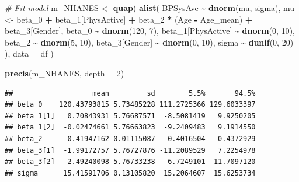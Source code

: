 \documentclass[
]{book}
\newenvironment{Shaded}{\begin{snugshade}}{\end{snugshade}}
\newcommand{\AttributeTok}[1]{\textcolor[rgb]{0.13,0.29,0.53}{#1}}
\newcommand{\CommentTok}[1]{\textcolor[rgb]{0.56,0.35,0.01}{\textit{#1}}}
\newcommand{\DecValTok}[1]{\textcolor[rgb]{0.00,0.00,0.81}{#1}}
\newcommand{\FunctionTok}[1]{\textcolor[rgb]{0.13,0.29,0.53}{\textbf{#1}}}
\newcommand{\NormalTok}[1]{#1}
\newcommand{\OtherTok}[1]{\textcolor[rgb]{0.56,0.35,0.01}{#1}}
\newcommand{\SpecialCharTok}[1]{\textcolor[rgb]{0.81,0.36,0.00}{\textbf{#1}}}
\begin{document}
\begin{Shaded}
\begin{Highlighting}[]
\CommentTok{\# Fit model}
\NormalTok{m\_NHANES }\OtherTok{\textless{}{-}} \FunctionTok{quap}\NormalTok{(}
  \FunctionTok{alist}\NormalTok{(}
\NormalTok{    BPSysAve }\SpecialCharTok{\textasciitilde{}} \FunctionTok{dnorm}\NormalTok{(mu, sigma), }
\NormalTok{    mu }\OtherTok{\textless{}{-}}\NormalTok{ beta\_0 }\SpecialCharTok{+}\NormalTok{ beta\_1[PhysActive] }\SpecialCharTok{+}\NormalTok{ beta\_2 }\SpecialCharTok{*}\NormalTok{ (Age }\SpecialCharTok{{-}}\NormalTok{ Age\_mean) }\SpecialCharTok{+}\NormalTok{ beta\_3[Gender],}
\NormalTok{    beta\_0 }\SpecialCharTok{\textasciitilde{}} \FunctionTok{dnorm}\NormalTok{(}\DecValTok{120}\NormalTok{, }\DecValTok{7}\NormalTok{),}
\NormalTok{    beta\_1[PhysActive] }\SpecialCharTok{\textasciitilde{}} \FunctionTok{dnorm}\NormalTok{(}\DecValTok{0}\NormalTok{, }\DecValTok{10}\NormalTok{),  }
\NormalTok{    beta\_2 }\SpecialCharTok{\textasciitilde{}} \FunctionTok{dnorm}\NormalTok{(}\DecValTok{5}\NormalTok{, }\DecValTok{10}\NormalTok{),}
\NormalTok{    beta\_3[Gender] }\SpecialCharTok{\textasciitilde{}} \FunctionTok{dnorm}\NormalTok{(}\DecValTok{0}\NormalTok{, }\DecValTok{10}\NormalTok{),  }
\NormalTok{    sigma }\SpecialCharTok{\textasciitilde{}} \FunctionTok{dunif}\NormalTok{(}\DecValTok{0}\NormalTok{, }\DecValTok{20}\NormalTok{) }
\NormalTok{  ),}
  \AttributeTok{data =}\NormalTok{ df}
\NormalTok{)}

\FunctionTok{precis}\NormalTok{(m\_NHANES, }\AttributeTok{depth =} \DecValTok{2}\NormalTok{)}
\end{Highlighting}
\end{Shaded}

\begin{verbatim}
##                   mean         sd        5.5%       94.5%
## beta_0    120.43793815 5.73485228 111.2725366 129.6033397
## beta_1[1]   0.70843931 5.76687571  -8.5081419   9.9250205
## beta_1[2]  -0.02474661 5.76663823  -9.2409483   9.1914550
## beta_2      0.41947162 0.01115087   0.4016504   0.4372929
## beta_3[1]  -1.99172757 5.76727876 -11.2089529   7.2254978
## beta_3[2]   2.49240098 5.76733238  -6.7249101  11.7097120
## sigma      15.41591706 0.13105820  15.2064607  15.6253734
\end{verbatim}
\end{document}
